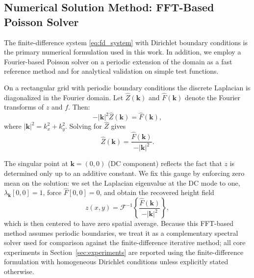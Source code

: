 \documentclass[11pt]{article}
\begin{document}
\begin{figure}[H]
\centering
{}
\end{figure}

\subsection{Numerical Solution Method: FFT-Based Poisson Solver}

The finite-difference system \eqref{eq:fd_system} with Dirichlet boundary conditions is the primary numerical formulation used in this work. In addition, we employ a Fourier-based Poisson solver on a periodic extension of the domain as a fast reference method and for analytical validation on simple test functions.

On a rectangular grid with periodic boundary conditions the discrete Laplacian is diagonalized in the Fourier domain. Let $\hat{Z}(\mathbf{k})$ and $\hat{F}(\mathbf{k})$ denote the Fourier transforms of $z$ and $f$. Then:
\begin{equation}
-|\mathbf{k}|^2 \hat{Z}(\mathbf{k}) = \hat{F}(\mathbf{k}),
\end{equation}
where $|\mathbf{k}|^2 = k_x^2 + k_y^2$. Solving for $\hat{Z}$ gives
\begin{equation}
\hat{Z}(\mathbf{k}) = \frac{\hat{F}(\mathbf{k})}{-|\mathbf{k}|^2}.
\end{equation}

The singular point at $\mathbf{k} = (0,0)$ (DC component) reflects the fact that $z$ is determined only up to an additive constant. We fix this gauge by enforcing zero mean on the solution: we set the Laplacian eigenvalue at the DC mode to one, $\lambda_{\mathbf{k}}[0,0] = 1$, force $\hat{F}[0,0] = 0$, and obtain the recovered height field
\begin{equation}
z(x,y) = \mathcal{F}^{-1}\left\{\frac{\hat{F}(\mathbf{k})}{-|\mathbf{k}|^2}\right\},
\end{equation}
which is then centered to have zero spatial average. Because this FFT-based method assumes periodic boundaries, we treat it as a complementary spectral solver used for comparison against the finite-difference iterative method; all core experiments in Section~\ref{sec:experiments} are reported using the finite-difference formulation with homogeneous Dirichlet conditions unless explicitly stated otherwise.
\end{document}
